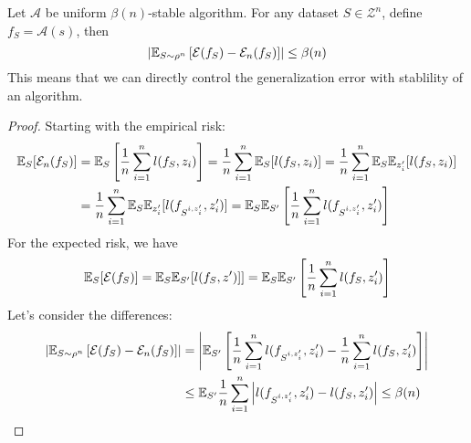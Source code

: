 \begin{theorem}
    Let $\mathcal{A}$ be uniform $\beta(n)$-stable algorithm. For any dataset $S\in\mathcal{Z}^n$, define $f_S = \mathcal{A}(s)$, then 
    \begin{equation*}
        \left| \mathbb{E}_{S\sim\rho^n}\left[ \mathcal{E}(f_S) - \mathcal{E}_n(f_S)  \right]  \right| \le \beta(n)
    \end{equation*}
    This means that we can directly control the generalization error with stablility of an algorithm.
\end{theorem}
\begin{proof}
    Starting with the empirical risk:
    \begin{equation*}
    \begin{aligned}
        \mathbb{E}_S[\mathcal{E}_n(f_S)] &= \mathbb{E}_S\left[ \frac{1}{n}\sum^n_{i=1}l(f_S, z_i) \right] = \frac{1}{n}\sum^n_{i=1}\mathbb{E}_S[l(f_S, z_i)] = \frac{1}{n}\sum^n_{i=1}\mathbb{E}_S\mathbb{E}_{z_i'}[l(f_S, z_i)] \\
        &= \frac{1}{n}\sum^n_{i=1}\mathbb{E}_S\mathbb{E}_{z_i'}[l(f_{S^{i, z_i'}}, z_i')] = \mathbb{E}_S\mathbb{E}_{S'}\left[ \frac{1}{n}\sum^n_{i=1}l(f_{S^{i, z_i'}}, z_i') \right]
    \end{aligned}
    \end{equation*}
    For the expected risk, we have 
    \begin{equation*}
    \begin{aligned}
        \mathbb{E}_S[\mathcal{E}(f_S)] = \mathbb{E}_S\mathbb{E}_{S'}[l(f_S, z')]] = \mathbb{E}_S\mathbb{E}_{S'}\left[ \frac{1}{n}\sum^n_{i=1}l(f_S, z_i') \right]
    \end{aligned}
    \end{equation*}
    Let's consider the differences:
    \begin{equation*}
    \begin{aligned}
        \left| \mathbb{E}_{S\sim\rho^n}\left[ \mathcal{E}(f_S) - \mathcal{E}_n(f_S)  \right] \right| &= \left|  \mathbb{E}_{S'}\left[ \frac{1}{n}\sum^n_{i=1}l(f_{S^{i, z_i'}}, z_i') -\frac{1}{n}\sum^n_{i=1}l(f_S, z_i') \right]  \right|\\
        &\le \mathbb{E}_{S'}\frac{1}{n}\sum^n_{i=1} \Big|l(f_{S^{i, z_i'}}, z_i')-l(f_S, z_i')\Big| \le \beta(n)
    \end{aligned}
    \end{equation*}
\end{proof}

